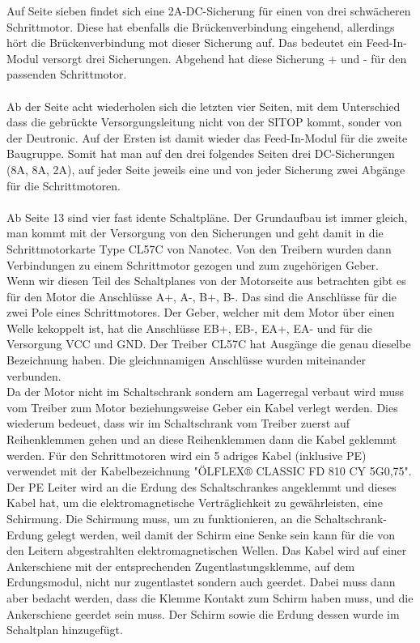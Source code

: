    Auf Seite sieben findet sich eine 2A-DC-Sicherung für einen von drei schwächeren Schrittmotor. Diese hat ebenfalls die Brückenverbindung eingehend, allerdings hört die Brückenverbindung mot dieser Sicherung auf. Das bedeutet ein Feed-In-Modul versorgt drei Sicherungen. Abgehend hat diese Sicherung + und - für den passenden Schrittmotor.\\\\
    Ab der Seite acht wiederholen sich die letzten vier Seiten, mit dem Unterschied dass die gebrückte Versorgungsleitung nicht von der SITOP kommt, sonder von der Deutronic. Auf der Ersten ist damit wieder das Feed-In-Modul für die zweite Baugruppe. Somit hat man auf den drei folgendes Seiten drei DC-Sicherungen (8A, 8A, 2A), auf jeder Seite jeweils eine und von jeder Sicherung zwei Abgänge für die Schrittmotoren.\\\\
    Ab Seite 13 sind vier fast idente Schaltpläne. Der Grundaufbau ist immer gleich, man kommt mit der Versorgung von den Sicherungen und geht damit in die Schrittmotorkarte Type CL57C von Nanotec. Von den Treibern wurden dann Verbindungen zu einem Schrittmotor gezogen und zum zugehörigen Geber.\\
    Wenn wir diesen Teil des Schaltplanes von der Motorseite aus betrachten gibt es für den Motor die Anschlüsse A+, A-, B+, B-. Das sind die Anschlüsse für die zwei Pole eines Schrittmotores. Der Geber, welcher mit dem Motor über einen Welle kekoppelt ist, hat die Anschlüsse EB+, EB-, EA+, EA-  und für die Versorgung VCC und GND. Der Treiber CL57C hat Ausgänge die genau dieselbe Bezeichnung haben. Die gleichnnamigen Anschlüsse wurden miteinander verbunden. \\Da der Motor nicht im Schaltschrank sondern am Lagerregal verbaut wird muss vom Treiber zum Motor beziehungsweise Geber ein Kabel verlegt werden. Dies wiederum bedeuet, dass wir im Schaltschrank vom Treiber zuerst auf Reihenklemmen gehen und an diese Reihenklemmen dann die Kabel geklemmt werden. Für den Schrittmotoren wird ein 5 adriges Kabel (inklusive PE) verwendet mit der Kabelbezeichnung "ÖLFLEX® CLASSIC FD 810 CY 5G0,75". Der PE Leiter wird an die Erdung des Schaltschrankes angeklemmt und dieses Kabel hat, um die elektromagnetische Verträglichkeit zu gewährleisten, eine Schirmung. Die Schirmung muss, um zu funktionieren, an die Schaltschrank-Erdung gelegt werden, weil damit der Schirm eine Senke sein kann für die von den Leitern abgestrahlten elektromagnetischen Wellen. Das Kabel wird auf einer Ankerschiene mit der entsprechenden Zugentlastungsklemme, auf dem Erdungsmodul, nicht nur zugentlastet sondern auch geerdet. Dabei muss dann aber bedacht werden, dass die Klemme Kontakt zum Schirm haben muss, und die Ankerschiene geerdet sein muss. Der Schirm sowie die Erdung dessen wurde im Schaltplan hinzugefügt. \\
